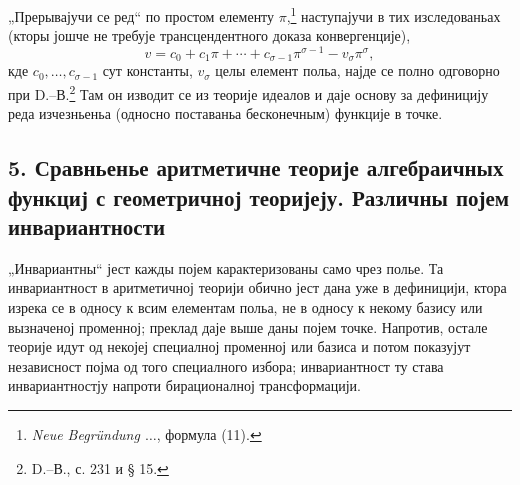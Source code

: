 ﻿\documentclass[11pt]{article}
\begin{document}
„Прерывајучи се ред“ по простом елементу \(\pi\),\footnote{\emph{Neue Begründung \(\ldots\)}, формула (11).} наступајучи в тих изследованьах (кторы јошче не требује трансцендентного доказа конвергенције),
\[
v=c_0+c_1\pi+\cdots+c_{\sigma-1}\pi^{\sigma-1}-v_\sigma\pi^\sigma,
\]
кде \(c_0,\ldots,c_{\sigma-1}\) сут константы, \(v_\sigma\) целы елемент польа, најде се полно одговорно при D.--В.\footnote{D.--В., с. 231 и § 15.} Там он изводит се из теорије идеалов и даје основу за дефиницију реда изчезньеньа (односно поставаньа бесконечным) функције в точке.

\subsection*{5. Сравньенье аритметичне теорије алгебраичных функциј с геометричној теоријеју. Различны појем инвариантности}
„Инвариантны“ јест кажды појем карактеризованы само чрез полье. Та инвариантност в аритметичној теорији обично јест дана уже в дефиницији, ктора изрека се в односу к всим елементам польа, не в односу к некому базису или вызначеној променној; преклад даје выше даны појем точке. Напротив, остале теорије идут од некојеј специалној променној или базиса и потом показујут независност појма од того специалного избора; инвариантност ту става инвариантностју напроти бирационалној трансформацији.
\end{document}
